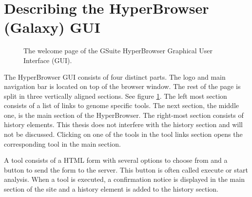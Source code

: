 \documentclass[english]{ifimaster}
\begin{document}
\section{Describing the HyperBrowser (Galaxy) GUI}
\label{sec:hyperBrowserGUI}
\begin{figure}
\centering
{}
\caption{The welcome page of the GSuite HyperBrowser Graphical User Interface (GUI).}
\label{fig:hyperBrowserGUI}
\end{figure}
The HyperBrowser GUI consists of four distinct parts. The logo and main navigation bar is located on top of the browser window. The rest of the page is split in three vertically aligned sections. See figure \ref{fig:hyperBrowserGUI}. The left most section consists of a list of links to genome specific tools. The next section, the middle one, is the main section of the HyperBrowser. The right-most section consists of history elements. This thesis does not interfere with the history section and will not be discussed. Clicking on one of the tools in the tool links section opens the corresponding tool in the main section. 

A tool consists of a HTML form with several options to choose from and a button to send the form to the server. This button is often called execute or start analysis. When a tool is executed, a confirmation notice is displayed in the main section of the site and a history element is added to the history section.
\end{document}
